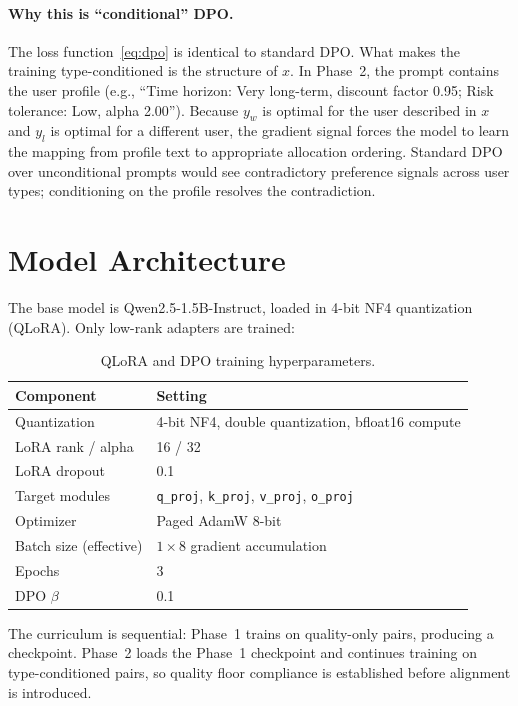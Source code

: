 \documentclass[11pt]{article}
\begin{document}
\paragraph{Why this is ``conditional'' DPO.}
The loss function~\eqref{eq:dpo} is identical to standard DPO. What makes the
training type-conditioned is the structure of $x$. In Phase~2, the prompt
contains the user profile (e.g., ``Time horizon: Very long-term, discount
factor 0.95; Risk tolerance: Low, alpha 2.00''). Because $y_w$ is optimal for
the user described in $x$ and $y_l$ is optimal for a different user, the
gradient signal forces the model to learn the mapping from profile text to
appropriate allocation ordering. Standard DPO over unconditional prompts
would see contradictory preference signals across user types;
conditioning on the profile resolves the contradiction.


\section{Model Architecture}

The base model is Qwen2.5-1.5B-Instruct, loaded in 4-bit NF4 quantization
(QLoRA). Only low-rank adapters are trained:

\begin{table}[h]
\centering
\begin{tabular}{ll}
\toprule
Component & Setting \\
\midrule
Quantization & 4-bit NF4, double quantization, bfloat16 compute \\
LoRA rank / alpha & 16 / 32 \\
LoRA dropout & 0.1 \\
Target modules & \texttt{q\_proj}, \texttt{k\_proj}, \texttt{v\_proj}, \texttt{o\_proj} \\
Optimizer & Paged AdamW 8-bit \\
Batch size (effective) & $1 \times 8$ gradient accumulation \\
Epochs & 3 \\
DPO $\beta$ & 0.1 \\
\bottomrule
\end{tabular}
\caption{QLoRA and DPO training hyperparameters.}
\label{tab:arch}
\end{table}

The curriculum is sequential: Phase~1 trains on quality-only pairs, producing
a checkpoint. Phase~2 loads the Phase~1 checkpoint and continues training on
type-conditioned pairs, so quality floor compliance is established before
alignment is introduced.
\end{document}
